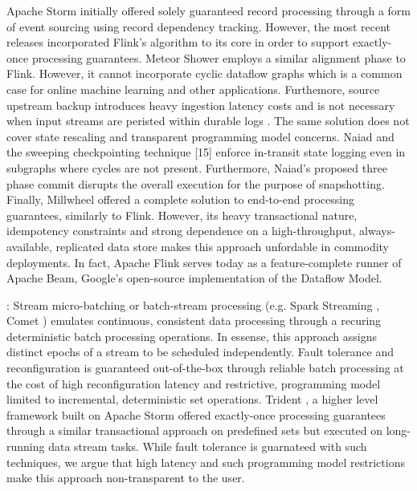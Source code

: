 Apache Storm \cite{CUSTOM:web/Storm} initially offered solely guaranteed record processing through a form of event sourcing using record dependency tracking. However, the most recent releases incorporated Flink's algorithm to its core \cite{CUSTOM:web/stormsux} in order to support exactly-once processing guarantees. Meteor Shower \cite{wang2012meteor} employs a similar alignment phase to Flink. However, it cannot incorporate cyclic dataflow graphs which is a common case for online machine learning \cite{de2015samoa} and other applications. Furthemore, source upstream backup introduces heavy ingestion latency costs and is not necessary when input streams are peristed within durable logs \cite{kreps2011kafka}. The same solution does not cover state rescaling and transparent programming model concerns. Naiad \cite{murray2013naiad} and the sweeping checkpointing technique [15] enforce in-transit state logging even in subgraphs where cycles are not present. Furthermore, Naiad's proposed three phase commit disrupts the overall execution for the purpose of snapshotting. Finally, Millwheel \cite{millwheel} offered a complete solution to end-to-end processing guarantees, similarly to Flink. However, its heavy transactional nature, idempotency constraints and strong dependence on a high-throughput, always-available, replicated data store \cite{chang2008bigtable,corbett2013spanner} makes this approach unfordable in commodity deployments. In fact, Apache Flink serves today as a feature-complete runner of Apache Beam, Google's open-source implementation of the Dataflow Model\cite{CUSTOM:web/Dataflow}.

: Stream micro-batching or batch-stream processing (e.g. Spark Streaming \cite{zaharia2012discretized}, Comet \cite{he2010comet}) emulates continuous, consistent data processing through a recuring deterministic batch processing operations. In essense, this approach assigns distinct epochs of a stream to be scheduled independently. Fault tolerance and reconfiguration is guaranteed out-of-the-box through reliable batch processing at the cost of high reconfiguration latency and restrictive, programming model limited to incremental, deterministic set operations. Trident \cite{CUSTOM:web/trident}, a higher level framework built on Apache Storm offered exactly-once processing guarantees through a similar transactional approach on predefined sets but executed on long-running data stream tasks. While fault tolerance is guarnateed with such techniques, we argue that high latency and such programming model restrictions make this approach non-transparent to the user. 
